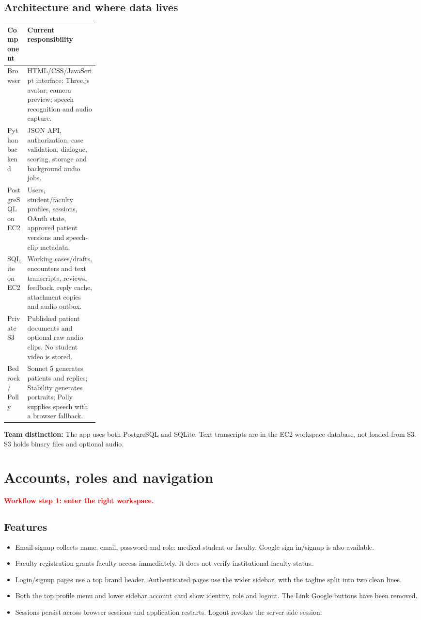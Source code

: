 \documentclass[10pt,letterpaper]{article}
\newcommand{\callout}[1]{\par\vspace{5pt}\noindent\colorbox{pale}{\parbox{\dimexpr\linewidth-2\fboxsep\relax}{\small #1}}\par\vspace{5pt}}
\newcommand{\page}[2]{\clearpage\section{#1}\textcolor{red}{\textbf{#2}}\par}
\begin{document}
\subsection*{Architecture and where data lives}
\begin{tabularx}{\linewidth}{@{}p{0.22\linewidth}X@{}}
\toprule
\textbf{Component} & \textbf{Current responsibility} \\
\midrule
Browser & HTML/CSS/JavaScript interface; Three.js avatar; camera preview; speech recognition and audio capture. \\
Python backend & JSON API, authorization, case validation, dialogue, scoring, storage and background audio jobs. \\
PostgreSQL on EC2 & Users, student/faculty profiles, sessions, OAuth state, approved patient versions and speech-clip metadata. \\
SQLite on EC2 & Working cases/drafts, encounters and text transcripts, reviews, feedback, reply cache, attachment copies and audio outbox. \\
Private S3 & Published patient documents and optional raw audio clips. No student video is stored. \\
Bedrock / Polly & Sonnet 5 generates patients and replies; Stability generates portraits; Polly supplies speech with a browser fallback. \\
\bottomrule
\end{tabularx}
\callout{\textbf{Team distinction:} The app uses both PostgreSQL and SQLite. Text transcripts are in the EC2 workspace database, not loaded from S3. S3 holds binary files and optional audio.}

\page{Accounts, roles and navigation}{Workflow step 1: enter the right workspace.}
\subsection*{Features}
\begin{itemize}
\item Email signup collects name, email, password and role: medical student or faculty. Google sign-in/signup is also available.
\item Faculty registration grants faculty access immediately. It does not verify institutional faculty status.
\item Login/signup pages use a top brand header. Authenticated pages use the wider sidebar, with the tagline split into two clean lines.
\item Both the top profile menu and lower sidebar account card show identity, role and logout. The Link Google buttons have been removed.
\item Sessions persist across browser sessions and application restarts. Logout revokes the server-side session.
\end{itemize}
\end{document}
